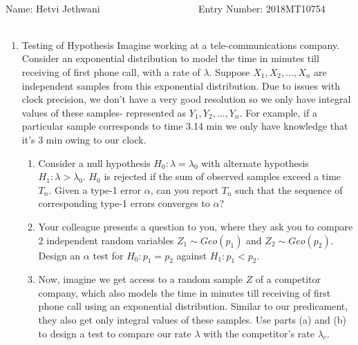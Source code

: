 \documentclass[12pt, oneside]{article}
\begin{document}
\setlength{\textheight}{8.5in}
\\





\vskip 0.5cm

\noindent Name: Hetvi Jethwani ~~~~~~~~~~~~~~~~~~~ Entry Number: 2018MT10754 ~~~~~~~~~~~~~~



\vskip 0.5cm


\begin{enumerate}


\item Testing of Hypothesis 
\newline Imagine working at a tele-communications company. Consider an exponential distribution to model the time in minutes till receiving of first phone call, with a rate of $\lambda$. Suppose $X_1,X_2,…,X_n$ are independent samples from this exponential distribution. Due to issues with clock precision, we don't have a very good resolution so we only have integral values of these samples- represented as $Y_1,Y_2,…,Y_n$. For example, if a particular sample corresponds to time 3.14 min we only have knowledge that it's 3 min owing to our clock.

\begin{enumerate}
    \item Consider a null hypothesis $H_0 : \lambda = \lambda_0$ with alternate hypothesis $H_1 : \lambda > \lambda_0$. $H_0$ is rejected if the sum of observed samples exceed a time $T_n$. Given a type-1 error $\alpha$, can you report $T_n$ such that the sequence of corresponding type-1 errors converges to $\alpha$?
    
    \item Your colleague presents a question to you, where they ask you to compare 2 independent random variables $Z_1 \sim Geo(p_1)$ and $Z_2 \sim Geo(p_2)$. Design an $\alpha$ test for $H_0 : p_1 = p_2$ against $H_1 : p_1 < p_2$.     

    \item Now, imagine we get access to a random sample $Z$ of a competitor company, which also models the time in minutes till receiving of first phone call using an exponential distribution. Similar to our predicament, they also get only integral values of these samples. Use parts (a) and (b) to design a test to compare our rate $\lambda$ with the competitor's rate $\lambda_c$.
\end{enumerate}


\end{enumerate}
\end{document}
